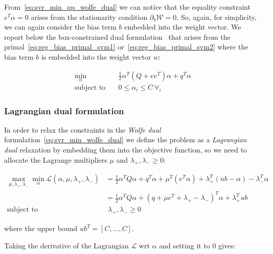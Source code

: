 From~\eqref{eq:svr_min_qp_wolfe_dual} we can notice that the equality constraint $e^T \alpha = 0$ arises from the stationarity condition $\partial_{{b}} \mathcal{W}=0$. So, again, for simplicity, we can again consider the bias term $b$ embedded into the weight vector. We report below the box-constrained dual formulation~\cite{hsu2002simple} that arises from the primal~\eqref{eq:reg_bias_primal_svm1} or~\eqref{eq:reg_bias_primal_svm2} where the bias term $b$ is embedded into the weight vector $w$:

\begin{equation} \label{eq:svr_min_bcqp_wolf_dual}
    \begin{aligned}
        \min_{\alpha} \quad & \frac{1}{2} \alpha^T (Q + ee^T)\alpha+q^T\alpha \\
            \text{subject to} \quad & 0\leq\alpha_i\leq C \ \forall_i
    \end{aligned}
\end{equation}

\subsubsection{Lagrangian dual formulation}

In order to relax the constraints in the \emph{Wolfe dual} formulation~\eqref{eq:svr_min_wolfe_dual} we define the problem as a \emph{Lagrangian dual} relaxation by embedding them into the objective function, so we need to allocate the Lagrange multipliers $\mu$ and $\lambda_+, \lambda_- \geq 0$:

\begin{equation} \label{eq:l1_svr_lagrangian_dual}
	\begin{aligned}
		    \max_{\mu,\lambda_+,\lambda_-} \min_{\alpha} \mathcal{L}(\alpha,\mu,\lambda_+,\lambda_-) &= \frac{1}{2} \alpha^T Q\alpha+q^T\alpha + \mu^T (e^T \alpha) + \lambda_+^T (ub - \alpha) - \lambda_-^T \alpha \\
    &= \frac{1}{2} \alpha^T Q\alpha + (q + \mu e^T + \lambda_+ - \lambda_-)^T \alpha + \lambda_+^T ub \\
    \text{subject to} \quad & \,\, \lambda_+, \lambda_- \geq 0
	\end{aligned}
\end{equation}

where the upper bound $ub^T = [C, \dots, C]$.

Taking the derivative of the Lagrangian $\mathcal{L}$ wrt $\alpha$ and setting it to 0 gives:

